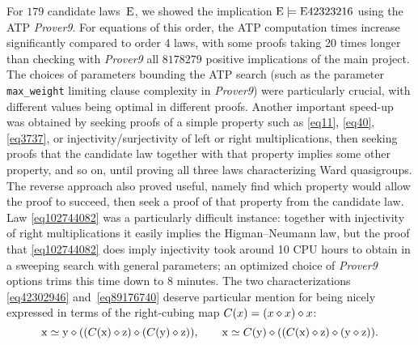 For $179$ candidate laws~$\mathrm{E}$, we showed the implication $\mathrm{E}\models\mathrm{E}42323216$ using the ATP \emph{Prover9}.  For equations of this order, the ATP computation times increase significantly compared to order 4 laws, with some proofs taking 20 times longer than checking with \emph{Prover9} all $\num{8178279}$ positive implications of the main project.  The choices of parameters bounding the ATP search (such as the parameter \texttt{max\_weight} limiting clause complexity in \emph{Prover9}) were particularly crucial, with different values being optimal in different proofs.  Another important speed-up was obtained by seeking proofs of a simple property such as \eqref{eq11}, \eqref{eq40}, \eqref{eq3737}, or injectivity/surjectivity of left or right multiplications, then seeking proofs that the candidate law together with that property implies some other property, and so on, until proving all three laws characterizing Ward quasigroups.  The reverse approach also proved useful, namely find which property would allow the proof to succeed, then seek a proof of that property from the candidate law.  Law \eqref{eq102744082} was a particularly difficult instance: together with injectivity of right multiplications it easily implies the Higman--Neumann law, but the proof that \eqref{eq102744082} does imply injectivity took around 10 CPU hours to obtain in a sweeping search with general parameters; an optimized choice of \emph{Prover9} options trims this time down to 8 minutes.  The two characterizations \eqref{eq42302946} and~\eqref{eq89176740} deserve particular mention for being nicely expressed in terms of the right-cubing map $C(x) = (x \diamond x) \diamond x$:
\[
  \mathrm{x} \simeq \mathrm{y} \diamond ((C(\mathrm{x}) \diamond \mathrm{z}) \diamond (C(\mathrm{y}) \diamond \mathrm{z})) , \qquad
  \mathrm{x} \simeq C(\mathrm{y}) \diamond ((C(\mathrm{x}) \diamond \mathrm{z}) \diamond (\mathrm{y} \diamond \mathrm{z})) .
\]


